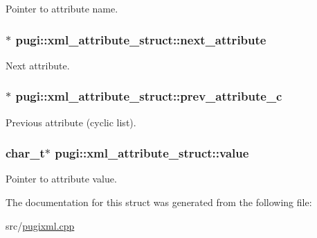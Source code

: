 Pointer to attribute name. \hypertarget{structpugi_1_1xml__attribute__struct_a9860c0eb7fa72dc9b69ee9b0575f9efc}{
\subsubsection[{next\_\-attribute}]{$\ast$ {\bf pugi::xml\_\-attribute\_\-struct::next\_\-attribute}}}
\label{structpugi_1_1xml__attribute__struct_a9860c0eb7fa72dc9b69ee9b0575f9efc}


Next attribute. \hypertarget{structpugi_1_1xml__attribute__struct_a0e3a022235b316e4cfc1034ceb7d7862}{
\subsubsection[{prev\_\-attribute\_\-c}]{$\ast$ {\bf pugi::xml\_\-attribute\_\-struct::prev\_\-attribute\_\-c}}}
\label{structpugi_1_1xml__attribute__struct_a0e3a022235b316e4cfc1034ceb7d7862}


Previous attribute (cyclic list). \hypertarget{structpugi_1_1xml__attribute__struct_ae652627d56cb9dcc0afdd1fbf6570364}{
\subsubsection[{value}]{\setlength{\rightskip}{0pt plus 5cm}char\_\-t$\ast$ {\bf pugi::xml\_\-attribute\_\-struct::value}}}
\label{structpugi_1_1xml__attribute__struct_ae652627d56cb9dcc0afdd1fbf6570364}


Pointer to attribute value. 

The documentation for this struct was generated from the following file:\begin{DoxyCompactItemize}
\item 
src/\hyperlink{pugixml_8cpp}{pugixml.cpp}\end{DoxyCompactItemize}
